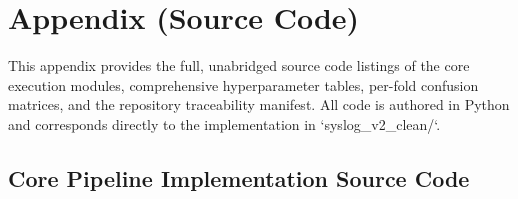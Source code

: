 \chapter{Appendix (Source Code)}
\label{ch:appendix}

This appendix provides the full, unabridged source code listings of the core execution modules, comprehensive hyperparameter tables, per-fold confusion matrices, and the repository traceability manifest. All code is authored in Python and corresponds directly to the implementation in `syslog_v2_clean/`.

\section{Core Pipeline Implementation Source Code}
\label{sec:appendix_source_code}

